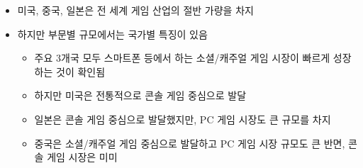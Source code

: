 \begin{itemize}
\begin{itemize}
	\item 미국, 중국, 일본은 전 세계 게임 산업의 절반 가량을 차지
	\item 하지만 부문별 규모에서는 국가별 특징이 있음
		\begin{itemize}
		\item 주요 3개국 모두 스마트폰  등에서 하는 소셜/캐주얼 게임 시장이 빠르게 성장하는 것이 확인됨
		\item 하지만 미국은 전통적으로 콘솔 게임 중심으로 발달
		\item 일본은 콘솔 게임 중심으로 발달했지만, PC 게임 시장도 큰 규모를 차지
		\item 중국은 소셜/캐주얼 게임 중심으로 발달하고 PC 게임 시장 규모도 큰 반면, 콘솔 게임 시장은 미미
		\end{itemize}
	\end{itemize}	
	

\end{itemize}
